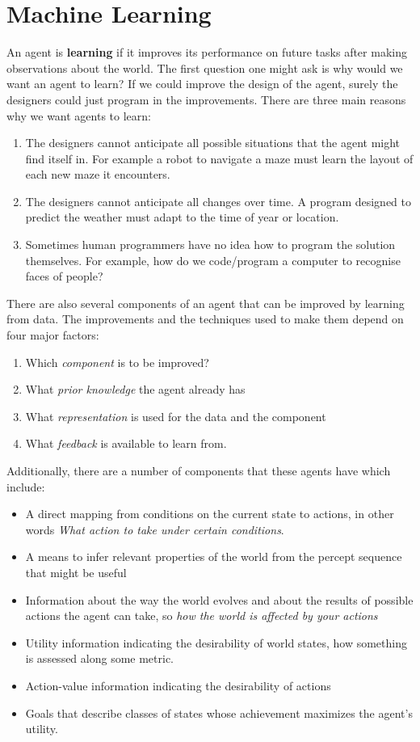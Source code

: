 \documentclass{article}
\begin{document}
\section{Machine Learning}
An agent is \textbf{learning} if it improves its performance on future tasks after making observations about the world. The first question one might ask is why would we want an agent to learn? If we could improve the design of the agent, surely the designers could just program in the improvements. There are three main reasons why we want agents to learn:
\begin{enumerate}
\item The designers cannot anticipate all possible situations that the agent might find itself in. For example a robot to navigate a maze must learn the layout of each new maze it encounters.
\item The designers cannot anticipate all changes over time. A program designed to predict the weather must adapt to the time of year or location.
\item Sometimes human programmers have no idea how to program the solution themselves. For example, how do we code/program a computer to recognise faces of people?
\end{enumerate}
There are also several components of an agent that can be improved by learning from data. The improvements and the techniques used to make them depend on four major factors:
\begin{enumerate}
\item Which \textit{component} is to be improved?
\item What \textit{prior knowledge} the agent already has
\item What \textit{representation} is used for the data and the component
\item What \textit{feedback} is available to learn from.
\end{enumerate}
Additionally, there are a number of components that these agents have which include:
\begin{itemize}
\item A direct mapping from conditions on the current state to actions, in other words \textit{What action to take under certain conditions}.
\item A means to infer relevant properties of the world from the percept sequence that might be useful
\item Information about the way the world evolves and about the results of possible actions the agent can take, so \textit{how the world is affected by your actions}
\item Utility information indicating the desirability of world states, how something is assessed along some metric.
\item Action-value information indicating the desirability of actions
\item Goals that describe classes of states whose achievement maximizes the agent's utility.
\end{itemize}
\end{document}
